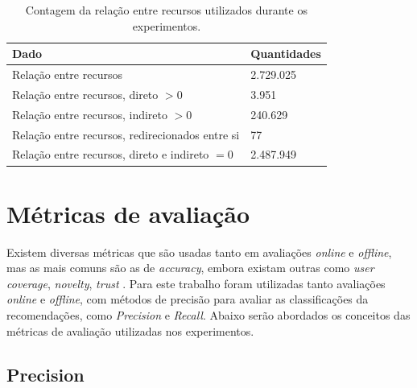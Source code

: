 \begin{table}[H]
\centering
\def\arraystretch{1.3}
\begin{tabular}{|l|l|}
\hline
\textbf{Dado}                                   & \textbf{Quantidades} \\ \hline
Relação entre recursos                          & 2.729.025            \\ \hline
Relação entre recursos, direto $> 0$ 			& 3.951                \\ \hline
Relação entre recursos, indireto $> 0$ 			& 240.629              \\ \hline
Relação entre recursos, redirecionados entre si & 77                   \\ \hline
Relação entre recursos, direto e indireto $= 0$ & 2.487.949            \\ \hline
\end{tabular}
\caption{Contagem da relação entre recursos utilizados durante os experimentos.}
\label{tab:lod_cache_stats}
\end{table}

\section{Métricas de avaliação}
\label{sec:av_metrics}

Existem diversas métricas que são usadas tanto em avaliações \textit{online} e \textit{offline}, mas as mais comuns são as de \textit{accuracy}, embora existam outras como \textit{user coverage}, \textit{novelty}, \textit{trust} \citep{Jannach:2010}. Para este trabalho foram utilizadas tanto avaliações \textit{online} e \textit{offline}, com métodos de precisão para avaliar as classificações da recomendações, como \textit{Precision} e \textit{Recall}. Abaixo serão abordados os conceitos das métricas de avaliação utilizadas nos experimentos.

\subsection{Precision}

